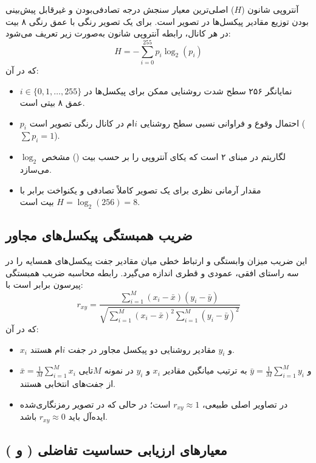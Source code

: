آنتروپی شانون ($H$) اصلی‌ترین معیار سنجش درجه تصادفی‌بودن و غیرقابل پیش‌بینی بودن توزیع مقادیر پیکسل‌ها در تصویر است. برای یک تصویر رنگی با عمق رنگی ۸ بیت در هر کانال، رابطه آنتروپی شانون به‌صورت زیر تعریف می‌شود:
\begin{equation}
H = -\sum_{i=0}^{255} p_i \log_2(p_i)
\label{eq:ch3-entropy}
\end{equation}
که در آن:
\begin{itemize}
    \item $i \in \{0, 1, \dots, 255\}$ نمایانگر ۲۵۶ سطح شدت روشنایی ممکن برای پیکسل‌ها در عمق ۸ بیتی است.
    \item $p_i$ احتمال وقوع و فراوانی نسبی سطح روشنایی $i$ام در کانال رنگی تصویر است ($\sum p_i = 1$).
    \item $\log_2$ لگاریتم در مبنای ۲ است که یکای آنتروپی را بر حسب بیت () مشخص می‌سازد.
    \item مقدار آرمانی نظری برای یک تصویر کاملاً تصادفی و یکنواخت برابر با $H = \log_2(256) = 8$ بیت است.
\end{itemize}

\subsection{ضریب همبستگی پیکسل‌های مجاور}

این ضریب میزان وابستگی و ارتباط خطی میان مقادیر جفت پیکسل‌های همسایه را در سه راستای افقی، عمودی و قطری اندازه می‌گیرد. رابطه محاسبه ضریب همبستگی پیرسون برابر است با:
\begin{equation}
r_{xy} = \frac{\sum_{i=1}^{M} (x_i - \bar{x})(y_i - \bar{y})}{\sqrt{\sum_{i=1}^{M} (x_i - \bar{x})^2 \sum_{i=1}^{M} (y_i - \bar{y})^2}}
\label{eq:ch3-corr}
\end{equation}
که در آن:
\begin{itemize}
    \item $x_i$ و $y_i$ مقادیر روشنایی دو پیکسل مجاور در جفت $i$ام هستند.
    \item $\bar{x} = \frac{1}{M}\sum_{i=1}^M x_i$ و $\bar{y} = \frac{1}{M}\sum_{i=1}^M y_i$ به ترتیب میانگین مقادیر $x_i$ و $y_i$ در نمونه $M$تایی از جفت‌های انتخابی هستند.
    \item در تصاویر اصلی طبیعی، $r_{xy} \approx 1$ است؛ در حالی که در تصویر رمزنگاری‌شده ایده‌آل باید $r_{xy} \approx 0$ باشد.
\end{itemize}

\subsection{معیارهای ارزیابی حساسیت تفاضلی ( و )}

